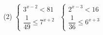 \begin{class}[number=4]
\begin{listofex}
		\item 
		\begin{tasks}(2)
			\task \( \begin{cases} 3^{x-2}<81 \\ \dfrac{1}{49} \le 7^{x+2} \end{cases} \)
			\task \( \begin{cases} 2^{x-3}<16 \\ \dfrac{1}{36} \le 6^{x+3} \end{cases} \)
		\end{tasks}
	\end{listofex}
\end{class}

